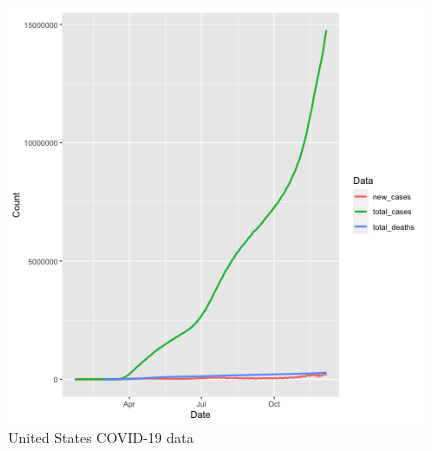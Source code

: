 \documentclass[11pt]{article}
\begin{document}
\begin{figure}[!h]
\centering
  \includegraphics[width=110mm]{R-Code/plots/usaCovid.png} 
  \caption{United States COVID-19 data}
\end{figure}

\clearpage
\medskip
\newpage

\nocite{*} 
 
\end{document}
